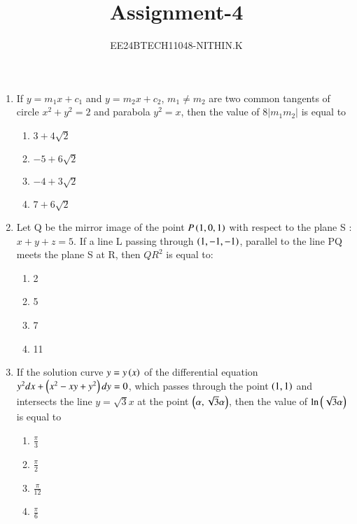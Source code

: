 \documentclass[journal]{IEEEtran}
\numberwithin{equation}{enumi}
\numberwithin{figure}{enumi}
\begin{document}


\title{Assignment-4}
\author{EE24BTECH11048-NITHIN.K} 
{\let\newpage\relax\maketitle}

\begin{enumerate}
\section{SECTION-A}
\item If $y = m_1x + c_1$ and $y = m_2x + c_2$, $m_1 \neq m_2$ are two common tangents of circle $x^2+y^2=2$ and parabola $y^2=x$, then the value of $8|m_1m_2|$ is equal to
	\begin{enumerate}
		\item $3+4\sqrt{2}$
		\item $-5+6\sqrt{2}$
		\item $-4+3\sqrt{2}$
		\item $7+6\sqrt{2}$
	\end{enumerate}
\item Let Q be the mirror image of the point $P\left(1,0,1\right)$ with respect to the plane S : $x+y+z=5$. If a line L passing through $\left(1,-1,-1\right)$, parallel to the line PQ meets the plane S at R, then $QR^2$ is equal to:
	\begin{enumerate}
		\item 2
		\item 5
		\item 7
		\item 11
	\end{enumerate}
\item If the solution curve $y=y\left(x\right)$ of the differential equation $y^2dx + \left(x^2-xy+y^2\right)dy = 0$, which passes through the point $\left(1,1\right)$ and intersects the line $y=\sqrt{3}x$ at the point $\left(\alpha,\sqrt{3}\alpha\right)$, then the value of $\ln\left(\sqrt{3}\alpha\right)$ is equal to
	\begin{enumerate}
		\item $\frac{\pi}{3}$
		\item $\frac{\pi}{2}$
		\item $\frac{\pi}{12}$
		\item $\frac{\pi}{6}$

\end{enumerate}
\end{enumerate}
\end{document}
